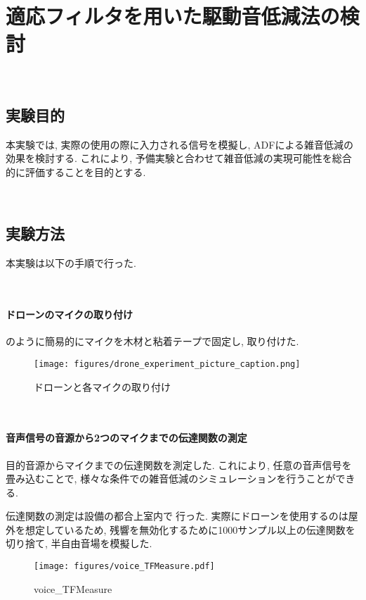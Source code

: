 \
\chapter{適応フィルタを用いた駆動音低減法の検討}\label{adf-practice}

\
\section{実験目的}\label{purpose-practice}

本実験では, 実際の使用の際に入力される信号を模擬し, ADFによる雑音低減の効果を検討する. 
これにより, 予備実験と合わせて雑音低減の実現可能性を総合的に評価することを目的とする. 

\
\section{実験方法}\label{instruction-practice}

本実験は以下の手順で行った. 

\
\subsubsection{ドローンのマイクの取り付け}\label{installment-mic}

のように簡易的にマイクを木材と粘着テープで固定し, 取り付けた. 

\begin{figure}[H]
\centering
\texttt{[image: figures/drone\_experiment\_picture\_caption.png]}
\caption{ドローンと各マイクの取り付け}
\label{fig:drone_experiment}
\end{figure}

\
\subsubsection{音声信号の音源から2つのマイクまでの伝達関数の測定}\label{observation-tf}

目的音源からマイクまでの伝達関数を測定した. これにより, 任意の音声信号を畳み込むことで, 様々な条件での雑音低減のシミュレーションを行うことができる. 

伝達関数の測定は設備の都合上室内で行った. 実際にドローンを使用するのは屋外を想定しているため, 残響を無効化するために1000サンプル以上の伝達関数を切り捨て, 半自由音場を模擬した. 

\begin{figure}[H]
\centering
\texttt{[image: figures/voice\_TFMeasure.pdf]}
\caption{voice\_TFMeasure}
\end{figure}

